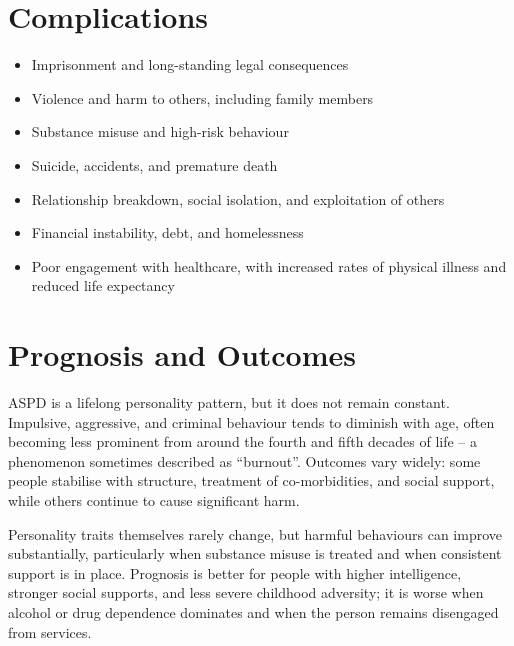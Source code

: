 \section*{Complications}
\begin{itemize}
    \item Imprisonment and long-standing legal consequences
    \item Violence and harm to others, including family members
    \item Substance misuse and high-risk behaviour
    \item Suicide, accidents, and premature death
    \item Relationship breakdown, social isolation, and exploitation of others
    \item Financial instability, debt, and homelessness
    \item Poor engagement with healthcare, with increased rates of physical illness and reduced life expectancy
\end{itemize}

\section*{Prognosis and Outcomes}
ASPD is a lifelong personality pattern, but it does not remain constant. Impulsive, aggressive, and criminal behaviour tends to diminish with age, often becoming less prominent from around the fourth and fifth decades of life -- a phenomenon sometimes described as ``burnout''. Outcomes vary widely: some people stabilise with structure, treatment of co-morbidities, and social support, while others continue to cause significant harm.

Personality traits themselves rarely change, but harmful behaviours can improve substantially, particularly when substance misuse is treated and when consistent support is in place. Prognosis is better for people with higher intelligence, stronger social supports, and less severe childhood adversity; it is worse when alcohol or drug dependence dominates and when the person remains disengaged from services.


